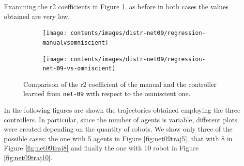 Examining the \gls{r2} coefficients in Figure \ref{fig:net09r2}, as before in  
both cases the values obtained are very low.
\begin{figure}[!htb]
	\centering
	\begin{subfigure}[h]{0.49\textwidth}
		\centering
		\texttt{[image: contents/images/distr-net09/regression-manualvsomniscient]}%
	\end{subfigure}
	\hfill
	\begin{subfigure}[h]{0.49\textwidth}
		\centering
		\texttt{[image: contents/images/distr-net09/regression-net-09-vs-omniscient]}
	\end{subfigure}
	\caption[Evaluation of the \gls{r2} coefficients of \texttt{net-09} 
	.]{Comparison of the \gls{r2} coefficient of the manual and the controller 
	learned from \texttt{net-09} with respect to the omniscient one.}
	\label{fig:net09r2}
\end{figure}

In the following figures are shown the trajectories obtained employing the 
three controllers. In particular, since the number of agents is variable, different 
plots were created depending on the quantity of robots. 
We show only three of the possible cases: the one with 5 agents in Figure 
\ref{fig:net09traj5}, that with 8 in Figure \ref{fig:net09traj8} and finally the one 
with 10 robot in Figure \ref{fig:net09traj10}. 

